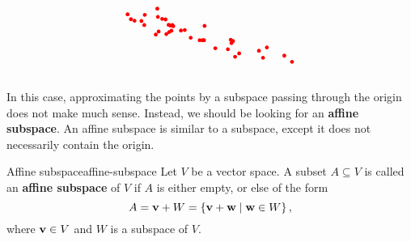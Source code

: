 \begin{equation*}
\begin{tikzpicture}[baseline=-0.5ex, scale=0.8]
    \fill[color=red] (2.60,1.00) circle (0.075);
    \fill[color=red] (-0.57,2.42) circle (0.075);
    \fill[color=red] (2.44,0.87) circle (0.075);
    \fill[color=red] (1.67,1.20) circle (0.075);
    \fill[color=red] (2.27,1.53) circle (0.075);
    \fill[color=red] (-1.48,2.27) circle (0.075);
    \fill[color=red] (-0.65,1.73) circle (0.075);
    \fill[color=red] (3.53,0.83) circle (0.075);
    \fill[color=red] (0.00,2.10) circle (0.075);
    \fill[color=red] (0.03,2.06) circle (0.075);
    \fill[color=red] (-0.40,2.34) circle (0.075);
    \fill[color=red] (0.48,1.91) circle (0.075);
    \fill[color=red] (-0.59,2.74) circle (0.075);
    \fill[color=red] (0.71,1.61) circle (0.075);
    \fill[color=red] (-0.04,1.88) circle (0.075);
    \fill[color=red] (0.33,1.89) circle (0.075);
    \fill[color=red] (4.66,0.67) circle (0.075);
    \fill[color=red] (3.68,1.23) circle (0.075);
    \fill[color=red] (1.06,1.51) circle (0.075);
    \fill[color=red] (-0.08,2.08) circle (0.075);
    \fill[color=red] (-0.24,1.75) circle (0.075);
    \fill[color=red] (4.36,0.91) circle (0.075);
    \fill[color=red] (1.17,1.51) circle (0.075);
    \fill[color=red] (1.25,2.07) circle (0.075);
    \fill[color=red] (2.36,1.48) circle (0.075);
    \fill[color=red] (-1.21,2.26) circle (0.075);
    \fill[color=red] (-0.13,1.83) circle (0.075);
    \fill[color=red] (1.23,1.51) circle (0.075);
    \fill[color=red] (2.30,1.40) circle (0.075);
    \fill[color=red] (-1.08,2.50) circle (0.075);
    \fill[color=red] (-1.62,2.33) circle (0.075);
    \fill[color=red] (-0.27,2.32) circle (0.075);
    \fill[color=red] (-1.75,2.52) circle (0.075);
    \fill[color=red] (3.37,1.10) circle (0.075);
    \fill[color=red] (-1.10,2.10) circle (0.075);
    \fill[color=red] (-0.54,1.85) circle (0.075);
    \fill[color=red] (2.16,1.16) circle (0.075);
    \fill[color=red] (-0.15,2.11) circle (0.075);
  \end{tikzpicture}
\end{equation*}
In this case, approximating the points by a subspace passing through
the origin does not make much sense. Instead, we should be looking for
an \textbf{affine subspace}. An affine subspace is similar to a
subspace, except it does not necessarily contain the origin.

\begin{definition}{Affine subspace}{affine-subspace}
  Let $V$ be a vector space. A subset $A\subseteq V$ is called an
  \textbf{affine subspace}%
   of $V$ if $A$ is either empty, or else of
  the form
  \begin{equation*}
    A = \vect{v} + W = \set{\vect{v}+\vect{w} \mid \vect{w}\in W},
  \end{equation*}
  where $\vect{v}\in V$ and $W$ is a subspace of\/ $V$.
\end{definition}

